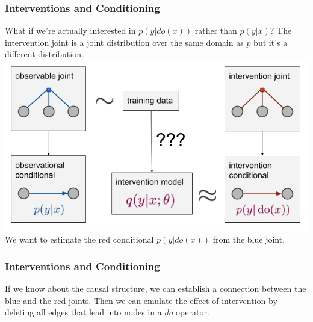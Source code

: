 \documentclass{beamer}
\begin{document}
\begin{frame}
    \frametitle{Interventions and Conditioning} 
    What if we're actually interested in $p(y|do(x))$ rather than $p(y|x)$? The intervention joint is a joint distribution over 
    the same domain as $p$ but it's a different distribution. \\
    \includegraphics[scale=0.4]{fig6.png} \\
    We want to estimate the red conditional $p(y|do(x))$ from the blue joint.
\end{frame}

\begin{frame}
    \frametitle{Interventions and Conditioning} 
    If we know about the causal structure, we can establish a connection between the blue and the red joints. 
    Then we can emulate the effect of intervention by deleting all edges that lead into  nodes in a $do$ operator. \\
\end{frame}
\end{document}
